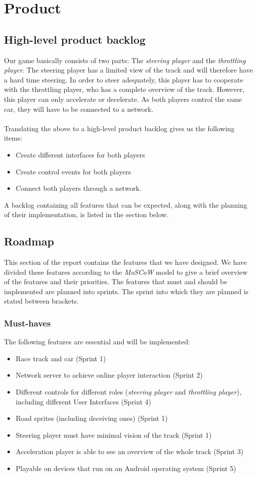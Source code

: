 \documentclass[11pt,twoside,a4paper]{article}
\begin{document}
\section{Product}
\subsection{High-level product backlog}
Our game basically consists of two parts: The \emph{steering player} and the \emph{throttling player}. The steering player has a limited view of the track and will therefore have a hard time steering. In order to steer adequately, this player has to cooperate with the throttling player, who has a complete overview of the track. However, this player can only accelerate or decelerate. As both players control the same car, they will have to be connected to a network. \\\\
Translating the above to a high-level product backlog gives us the following items:
\begin{itemize}
	\item Create different interfaces for both players
	\item Create control events for both players
	\item Connect both players through a network.
\end{itemize}
A backlog containing all features that can be expected, along with the planning of their implementation, is listed in the section below.


\newpage

\subsection{Roadmap}
This section of the report contains the features that we have designed. We have divided these features according to the \emph{MoSCoW} model to give a brief overview of the features and their priorities. The features that must and should be implemented are planned into sprints. The sprint into which they are planned is stated between brackets.
\subsubsection{Must-haves}
The following features are essential and will be implemented:
\begin{itemize}
	\item Race track and car (Sprint 1)
	\item Network server to achieve online player interaction (Sprint 2)
	\item Different controls for different roles (\emph{steering player} and \emph{throttling player}), including different User Interfaces (Sprint 4)
	\item Road sprites (including deceiving ones) (Sprint 1)
    \item Steering player must have minimal vision of the track (Sprint 1)
    \item Acceleration player is able to see an overview of the whole track (Sprint 3)
    \item Playable on devices that run on an Android operating system (Sprint 5)
\end{itemize}
\end{document}
